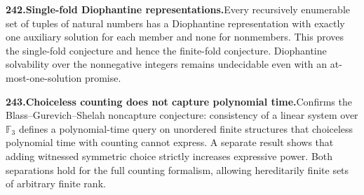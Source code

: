 \documentclass[11pt,a4paper]{article}
\begin{document}
  \par \begin{minipage}{\linewidth}
  \fontsize{10.5}{12.6}\selectfont\RaggedRight
  \hypertarget{result 242}{}
  {\bfseries\textcolor{muted}{242.}\enspace Single-fold Diophantine representations.}\enspace Every recursively enumerable set of tuples of natural numbers has a Diophantine representation with exactly one auxiliary solution for each member and none for nonmembers. This proves the single-fold conjecture and hence the finite-fold conjecture. Diophantine solvability over the nonnegative integers remains undecidable even with an at-most-one-solution promise.\par
  \end{minipage}\par\vspace{5pt}



  \par \begin{minipage}{\linewidth}
  \fontsize{10.5}{12.6}\selectfont\RaggedRight
  \hypertarget{result 243}{}
  {\bfseries\textcolor{muted}{243.}\enspace Choiceless counting does not capture polynomial time.}\enspace Confirms the Blass--Gurevich--Shelah noncapture conjecture: consistency of a linear system over $\mathbb F_3$ defines a polynomial-time query on unordered finite structures that choiceless polynomial time with counting cannot express. A separate result shows that adding witnessed symmetric choice strictly increases expressive power. Both separations hold for the full counting formalism, allowing hereditarily finite sets of arbitrary finite rank.\par
  \end{minipage}\par\vspace{5pt}
\end{document}

